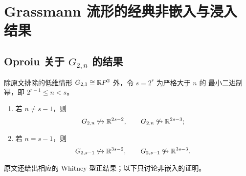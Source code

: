 \section{Grassmann 流形的经典非嵌入与浸入结果}
\label{sec:classical}

\subsection{Oproiu 关于 $G_{2,n}$ 的结果}

\begin{theorem}\label{thm:oproiu-G2}
除原文排除的低维情形 $G_{2,1}\cong\mathbb{R} P^{2}$ 外，令 $s=2^{r}$ 为严格大于 $n$ 的
最小二进制幂，即 $2^{r-1}\le n<s$。
\begin{enumerate}[label=(\roman*),leftmargin=2.2em]
  \item 若 $n\neq s-1$，则
        \[
          G_{2,n}\not\hookrightarrow\mathbb{R}^{2s-2},
          \qquad
          G_{2,n}\not\looparrowright\mathbb{R}^{2s-3};
        \]
  \item 若 $n=s-1$，则
        \[
          G_{2,s-1}\not\hookrightarrow\mathbb{R}^{3s-2},
          \qquad
          G_{2,s-1}\not\looparrowright\mathbb{R}^{3s-3}.
        \]
\end{enumerate}
\end{theorem}

原文还给出相应的 Whitney 型正结果；以下只讨论非嵌入的证明。

